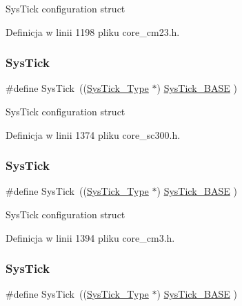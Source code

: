 Sys\+Tick configuration struct 

Definicja w linii 1198 pliku core\+\_\+cm23.\+h.

\mbox{\label{group___c_m_s_i_s__core__base_gacd96c53beeaff8f603fcda425eb295de}} 
\subsubsection{\texorpdfstring{Sys\+Tick}{SysTick}\hspace{0.1cm}{\footnotesize\ttfamily [7/12]}}
{\footnotesize\ttfamily \#define Sys\+Tick~((\hyperlink{struct_sys_tick___type}{Sys\+Tick\+\_\+\+Type}   $\ast$)     \hyperlink{group___c_m_s_i_s__core__base_ga58effaac0b93006b756d33209e814646}{Sys\+Tick\+\_\+\+B\+A\+SE}  )}

Sys\+Tick configuration struct 

Definicja w linii 1374 pliku core\+\_\+sc300.\+h.

\mbox{\label{group___c_m_s_i_s__core__base_gacd96c53beeaff8f603fcda425eb295de}} 
\subsubsection{\texorpdfstring{Sys\+Tick}{SysTick}\hspace{0.1cm}{\footnotesize\ttfamily [8/12]}}
{\footnotesize\ttfamily \#define Sys\+Tick~((\hyperlink{struct_sys_tick___type}{Sys\+Tick\+\_\+\+Type}   $\ast$)     \hyperlink{group___c_m_s_i_s__core__base_ga58effaac0b93006b756d33209e814646}{Sys\+Tick\+\_\+\+B\+A\+SE}  )}

Sys\+Tick configuration struct 

Definicja w linii 1394 pliku core\+\_\+cm3.\+h.

\mbox{\label{group___c_m_s_i_s__core__base_gacd96c53beeaff8f603fcda425eb295de}} 
\subsubsection{\texorpdfstring{Sys\+Tick}{SysTick}\hspace{0.1cm}{\footnotesize\ttfamily [9/12]}}
{\footnotesize\ttfamily \#define Sys\+Tick~((\hyperlink{struct_sys_tick___type}{Sys\+Tick\+\_\+\+Type}   $\ast$)     \hyperlink{group___c_m_s_i_s__core__base_ga58effaac0b93006b756d33209e814646}{Sys\+Tick\+\_\+\+B\+A\+SE}  )}

